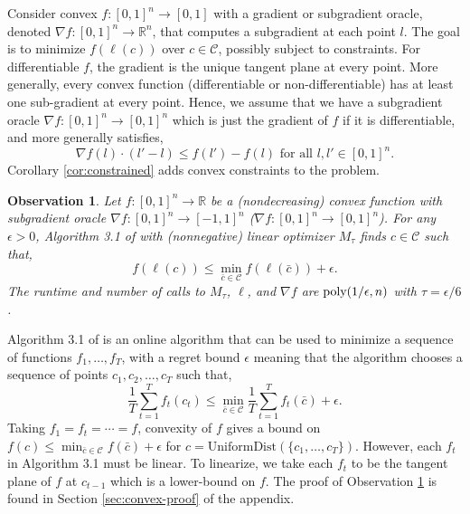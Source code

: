 \documentclass[final, 12pt]{colt2018} %
\def\reals{{\mathbb R}}
\newcommand{\eps}{\epsilon}
\def\calC{\mathcal{C}}
\newcommand{\poly}{\mathop{\mbox{\text{poly}}}}
\newtheorem{observation}[theorem]{Observation}
\begin{document}
Consider convex $f:[0,1]^n\rightarrow [0,1]$ with a gradient or subgradient oracle, denoted $\nabla f:[0,1]^n\rightarrow \reals^n$, that computes a subgradient at each point $l$. The goal is to minimize $f(\ell(c))$ over $c\in \calC$, possibly subject to constraints. For differentiable $f$, the gradient is the  unique tangent plane at every point. More generally, every convex function (differentiable or non-differentiable) has at least one sub-gradient at every point. Hence, we assume that we have a subgradient oracle $\nabla f:[0,1]^n\rightarrow [0,1]^n$ which is just the gradient of $f$ if it is differentiable, and more generally satisfies,
\begin{equation}\label{eq:subgradient}
\nabla f(l) \cdot (l'-l) \leq f(l')-f(l) \text{ for all }l, l' \in [0,1]^n.
\end{equation}
Corollary \ref{cor:constrained} adds convex constraints to the problem.


\begin{observation}\label{obs:convex}
Let $f:[0,1]^n\rightarrow \reals$ be a (nondecreasing) convex function with subgradient oracle $\nabla f:[0,1]^n \rightarrow [-1,1]^n$ ($\nabla f:[0,1]^n \rightarrow [0,1]^n$).
For any $\eps>0$, Algorithm 3.1 of \cite{KakadeKL09} with (nonnegative) linear optimizer $M_\tau$  finds $c \in \calC$ such that,
$$f(\ell(c)) \leq \min_{\bar{c} \in \calC} f(\ell(\bar{c})) + \eps.$$
The runtime and number of calls to $M_\tau$, $\ell$, and $\nabla f$ are $\poly(1/\eps, n)$ with $\tau=\eps/6$.
\end{observation}
Algorithm 3.1 of \cite{KakadeKL09} is an online algorithm that can be used to minimize a sequence of functions $f_1, \ldots, f_T$, with a regret bound $\eps$ meaning that the algorithm chooses a sequence of points $c_1, c_2, \ldots, c_T$ such that,
$$\frac{1}{T} \sum_{t=1}^T f_t(c_t)  \leq \min_{\bar{c} \in \calC} \frac{1}{T} \sum_{t=1}^T f_t(\bar{c})+\eps.$$  
Taking $f_1=f_t=\cdots=f$, convexity of $f$ gives a bound on $f(c)\leq \min_{\bar{c}\in\calC} f(\bar{c}) + \eps$ for $c=\mathrm{UniformDist}(\{c_1, \ldots, c_T\})$. However, each $f_t$ in Algorithm 3.1 must be linear. To linearize, we take each $f_t$ to be the tangent plane of $f$ at $c_{t-1}$ which is a lower-bound on $f$. The proof of Observation \ref{obs:convex} is found in Section \ref{sec:convex-proof} of the appendix. 
\end{document}
